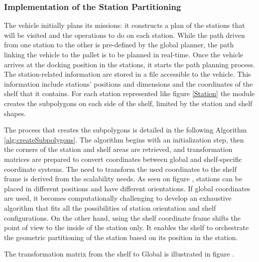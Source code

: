 \subsubsection{Implementation of the Station Partitioning}
The vehicle initially plans its missions: it constructs a plan of the stations that will be visited and the operations
to do on each station. While the path driven from one station to the other is pre-defined by the global planner, 
the path linking the vehicle to the pallet is to be planned in real-time. 
Once the vehicle arrives at the docking position in the stations, it starts the path planning process. 
The station-related information are stored in a file accessible to the vehicle. This information include stations' 
positions and dimensions and the coordinates of the shelf that it contains.
For each station represented like figure \ref{Station} the module creates the subpolygons on each side of the shelf, 
limited by the station and shelf shapes. 

The process that creates the subpolygons is detailed in the following Algorithm \ref{alg:createSubpolygons}.
The algorithm begins with an initialization step, then the corners of the station and shelf areas are retrieved, and 
transformation matrices are prepared to convert coordinates between global and shelf-specific coordinate systems. 
The need to transform the used coordinates to the shelf frame is derived from the scalability needs.
As seen on figure , stations can be placed in different positions and have different orientations.
If global coordinates are used, it becomes computationally challenging to develop an exhaustive algorithm that fits all the 
possibilities of station orientation and shelf configurations. On the other hand, using the shelf coordinate frame shifts 
the point of view to the inside of the station only. It enables the shelf to orchestrate the geometric partitioning 
of the station based on its position in the station.

The transformation matrix from the shelf to Global is illustrated in figure .

